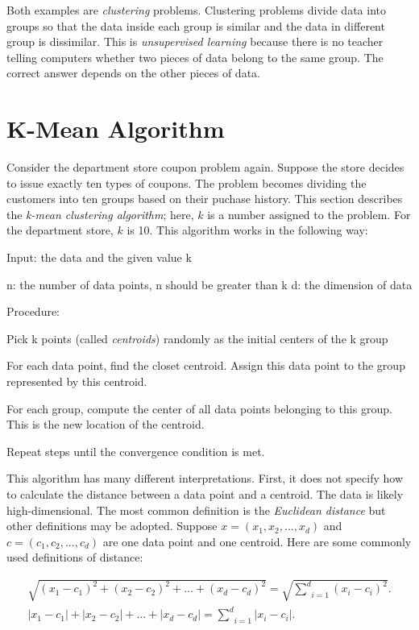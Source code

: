 Both examples are {\it clustering} problems. Clustering problems
divide data into groups so that the data inside each group is similar
and the data in different group is dissimilar.  This is {\it
  unsupervised learning} because there is no teacher telling computers
whether two pieces of data belong to the same group.  The correct
answer depends on the other pieces of data.

\section{K-Mean Algorithm}

Consider the department store coupon problem again. Suppose the store
decides to issue exactly ten types of coupons.  The problem becomes
dividing the customers into ten groups based on their puchase history.
This section describes the {\it k-mean clustering algorithm};
here, $k$ is a number assigned to the problem.
For the department store, $k$ is 10.
This algorithm works in the following way:

Input: the data and the given value k

n: the number of data points, n should be greater than k
d: the dimension of data

Procedure:

Pick k points (called {\it centroids}) randomly as the initial centers of the k group

For each data point, find the closet centroid. Assign this data point to the group represented by this centroid.

For each group, compute the center of all data points belonging to this group. This is the new location of the centroid.

Repeat steps until the convergence condition is met.


This algorithm has many different interpretations. First, it does not
specify how to calculate the distance between a data point and a
centroid.  The data is likely high-dimensional.  The most common
definition is the {\it Euclidean distance} but other definitions may
be adopted.  Suppose $x = (x_1, x_2, ..., x_d)$ and $c = (c_1, c_2,
..., c_d)$ are one data point and one centroid.  Here are some
commonly used definitions of distance:

\begin{gather}
  \sqrt{(x_1 - c_1) ^ 2 + (x_2 - c_2) ^ 2 + ... + (x_d - c_d) ^ 2} = \sqrt{\underset{i=1}{\overset{d}{\sum}} (x_i - c_i) ^ 2}.
  \label{equ:EuclideanDistance}
    \\
    |x_1 - c_1 |  + | x_2 - c_2 |  + ... + | x_d - c_d | = \underset{i=1}{\overset{d}{\sum}} |x_i - c_i|.
    \label{equ:1NormDistance}
\end{gather}

